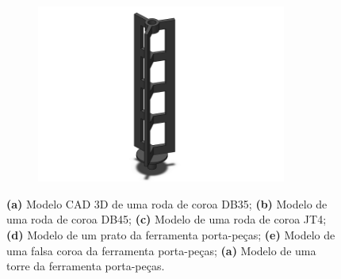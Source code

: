 \begin{figure}[htb]
\begin{subfigure}{.33\textwidth}
        \includegraphics[width = 0.9\textwidth]{Figures/Cap3/CAD_TORRE.png}
        \caption{}
        \label{fig:CAD_Torre}
    \end{subfigure}
    \caption[Modelos 3D das rodas de coroa e dos elementos da ferramenta porta-peças.]%
    {\textbf{(a)} Modelo CAD 3D de uma roda de coroa DB35; \textbf{(b)} Modelo de uma roda de coroa DB45; \textbf{(c)} Modelo de uma roda de coroa JT4; \textbf{(d)} Modelo de um prato da ferramenta porta-peças; \textbf{(e)} Modelo de uma falsa coroa da ferramenta porta-peças; \textbf{(a)} Modelo de uma torre da ferramenta porta-peças.}
\end{figure}
